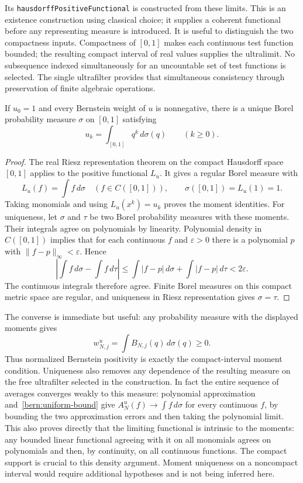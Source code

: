 Its \texttt{hausdorffPositiveFunctional} is constructed from these limits. This is an
existence construction using classical choice; it supplies a coherent
functional before any representing measure is introduced.
It is useful to distinguish the two compactness inputs. Compactness of
$[0,1]$ makes each continuous test function bounded; the
resulting compact interval of real values supplies the ultralimit.
No subsequence indexed simultaneously for an uncountable set of
test functions is selected. The single ultrafilter provides that
simultaneous consistency through preservation of finite algebraic
operations.

\label{bern:measure-page}

\begin{theorem}\label{bern:measure}
If $u_0=1$ and every Bernstein weight of $u$ is nonnegative, there
is a unique Borel probability measure $\sigma$ on $[0,1]$ satisfying
\begin{equation}\label{bern:measure-moments}
 u_k=\int_{[0,1]}q^k\,d\sigma(q)\qquad(k\ge0).
\end{equation}
\end{theorem}
\begin{proof}
The real Riesz representation theorem on the compact Hausdorff
space $[0,1]$ applies to the positive functional $L_u$. It gives a
regular Borel measure with
\[
 L_u(f)=\int f\,d\sigma\quad(f\in C([0,1])),
 \qquad \sigma([0,1])=L_u(1)=1.
\]
Taking monomials and using $L_u(x^k)=u_k$ proves the moment
identities. For uniqueness, let $\sigma$ and $\tau$ be two Borel
probability measures with these moments. Their integrals agree on
polynomials by linearity. Polynomial density in $C([0,1])$ implies
that for each continuous $f$ and $\varepsilon>0$ there is a
polynomial $p$ with $\|f-p\|_\infty<\varepsilon$. Hence
\[
 \left|\int f\,d\sigma-\int f\,d\tau\right|
 \le\int|f-p|\,d\sigma+\int|f-p|\,d\tau<2\varepsilon.
\]
The continuous integrals therefore agree. Finite Borel measures on
this compact metric space are regular, and uniqueness in Riesz
representation gives $\sigma=\tau$.
\end{proof}

The converse is immediate but useful: any probability measure with
the displayed moments gives
\[
 w^u_{N,j}=\int B_{N,j}(q)\,d\sigma(q)\ge0.
\]
Thus normalized Bernstein positivity is exactly the compact-interval
moment condition. Uniqueness also removes any dependence of the
resulting measure on the free ultrafilter selected in the construction.
In fact the entire sequence of averages converges weakly to this
measure: polynomial approximation and~\eqref{bern:uniform-bound}
give $A_N^u(f)\to\int f\,d\sigma$ for every continuous $f$, by
bounding the two approximation errors and then taking the polynomial
limit.
This also proves directly that the limiting functional is intrinsic
to the moments: any bounded linear functional agreeing with it on
all monomials agrees on polynomials and then, by continuity, on all
continuous functions. The compact support is crucial to this density
argument. Moment uniqueness on a noncompact interval would require
additional hypotheses and is not being inferred here.

